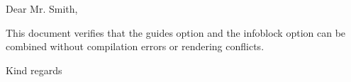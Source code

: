 \documentclass[guides, infoblock, lang=english]{../../onlinebrief24}
\begin{document}
\begin{letter}{}
\opening{Dear Mr. Smith,}

This document verifies that the guides option and the infoblock option
can be combined without compilation errors or rendering conflicts.

\closing{Kind regards}
\end{letter}
\end{document}
